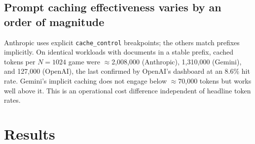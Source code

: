 \documentclass[11pt]{article}
\begin{document}
\subsection{Prompt caching effectiveness varies by an order of magnitude}

Anthropic uses explicit \texttt{cache\_control} breakpoints; the others match
prefixes implicitly. On identical workloads with documents in a stable prefix,
cached tokens per $N{=}1024$ game were $\approx$2{,}008{,}000 (Anthropic),
1{,}310{,}000 (Gemini), and 127{,}000 (OpenAI), the last confirmed by OpenAI's
dashboard at an 8.6\% hit rate. Gemini's implicit caching does not engage below
$\approx$70{,}000 tokens but works well above it. This is an operational cost
difference independent of headline token rates.

\section{Results}
\label{sec:results}
\end{document}
